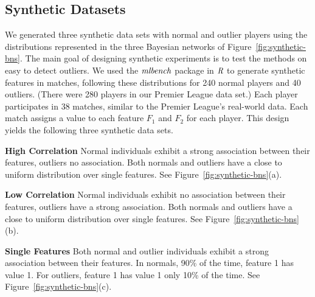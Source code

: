 {								
				
				

	\subsection{Synthetic Datasets}\label{sec:visual}
	We generated three synthetic data sets with normal and outlier players using the distributions represented in the three Bayesian networks of Figure~\ref{fig:synthetic-bns}. The main goal of designing synthetic experiments is to test the methods on  easy to detect outliers. 
	 We used the $\it{mlbench}$ package in $\it{R}$ to generate synthetic features in matches, following these distributions for 240 normal players and 40 outliers. (There were 280 players in our Premier League data set.) Each player participates in 38 matches, similar to the Premier League's real-world data. Each match assigns a value to each feature $F_1$ and $F_{2}$ for each player. This design yields the following three synthetic data sets. 
	\begin{description}
		\item\textbf{High Correlation}  Normal individuals exhibit a strong association between their features, outliers no association. Both normals and outliers have a close to uniform distribution over single features. See Figure~\ref{fig:synthetic-bns}(a).
		\item\textbf{Low Correlation}  Normal individuals exhibit no association between their features, outliers have a strong association. Both normals and outliers have a close to uniform distribution over single features. See Figure~\ref{fig:synthetic-bns}(b).
		\item\textbf{Single Features} Both normal and outlier individuals exhibit a strong association between their features. In normals, 90\% of the time, feature 1 has value 1. For outliers, feature 1 has value 1 only 10\% of the time. See Figure~\ref{fig:synthetic-bns}(c).
	\end{description}
	
}

